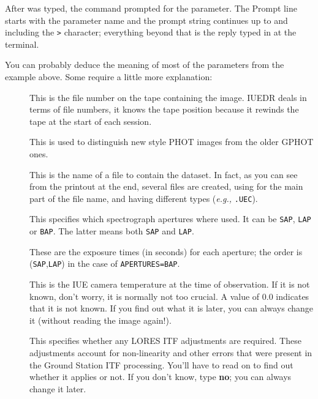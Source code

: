 After  was typed, the command prompted for
the 
parameter.  The Prompt line starts with the parameter name and the
prompt string continues up to and including the \verb+>+ character; everything
beyond that is the reply typed in at the terminal.

You can probably deduce the meaning of most of the
 parameters
from the example above.  Some require a little more explanation:

\begin{description}

\item []
      This is the file number on the tape containing the image.
      IUEDR deals in terms of file numbers, it knows the tape position because
      it rewinds the tape at the start of each session.

\item []
      This is used to distinguish new style PHOT images from the
      older GPHOT ones.

\item []
      This is the name of a file to contain the dataset.  In
      fact, as you can see from the printout at the end, several files are
      created, using  for the main part of
      the file name, and
      having different types ({\it{e.g.,}} \verb+.UEC+)\@.

\item []
      This specifies which spectrograph apertures where used.
      It can be \verb+SAP+, \verb+LAP+ or \verb+BAP+\@. The latter means both
      \verb+SAP+ and \verb+LAP+\@.

\item []
      These are the exposure times (in seconds) for each
      aperture; the order is (\verb+SAP+,\verb+LAP+) in the case of
      \verb+APERTURES=BAP+\@.

\item []
      This is the IUE camera temperature at the time of
      observation.  If it is not known, don't worry, it is normally not too
      crucial.  A value of 0.0 indicates that it is not known.  If you find out
      what it is later, you can always change it (without reading the image
      again!)\@.

\item []
      This specifies whether any LORES ITF adjustments are
      required.  These adjustments account for non-linearity and other errors
      that were present in the Ground Station ITF processing.  You'll have to
      read on to find out whether it applies or not.  If you don't know, type
      {\bf no}; you can always change it later.

\end{description}

